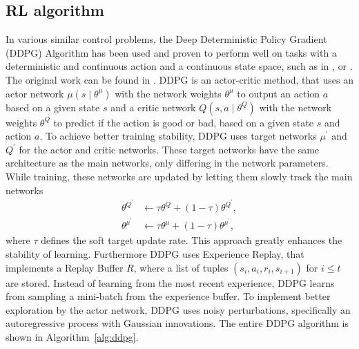 \documentclass[review]{elsarticle}
\providecommand{\3}{{\ss}}
\begin{document}
	\subsection{\label{RL-algorithm}RL algorithm}
	In various similar control problems, the Deep Deterministic Policy
	Gradient (DDPG) Algorithm has been used and proven to perform well on
	tasks with a deterministic and continuous action and a
	continuous state space, such as in
	\cite{SafeEfficientAndComfortable}, \cite{ComparisonRLvsMPC} or
	\cite{HumanLikeAutonomouCF}. The original work can be found in
	\cite{DDPG}. DDPG is an actor-critic method, that uses an actor network
	$\mu\left(s \mid \theta^{\mu}\right)$ with the network weights $\theta^{\mu} $
	to output an action $a$ based on a given state $s$ and a critic network
	$Q\left(s, a \mid \theta^{Q}\right) $ with the network weights  $\theta^{Q}$ to
	predict if the action is good or bad, based on a given state $s$ and
	action $a$. 
	To achieve better training stability, DDPG uses target networks  $\mu^{\prime}$ and $Q^{\prime}$ for the actor and critic networks.
	These target networks have the same architecture as the main networks, only differing in the network parameters. While training, these networks are updated by
	letting them slowly track the main networks
	\begin{align}
		\theta^{Q^{\prime}} & \leftarrow \tau \theta^{Q}+(1-\tau) \theta^{Q^{\prime}}, \\
		\theta^{\mu^{\prime}} & \leftarrow \tau \theta^{\mu}+(1-\tau) \theta^{\mu^{\prime}},
	\end{align}
	where $\tau$ defines the soft target update rate.
	This approach greatly enhances the stability of learning.
	Furthermore DDPG uses Experience Replay, that implements a Replay Buffer $R$, where a list of tuples $\left(s_{i}, a_{i}, r_{i}, s_{i+1}\right)$ for $i \le t$ are stored. Instead of learning from the most recent experience, DDPG learns from sampling a mini-batch from the experience buffer. To implement better exploration by the actor network, DDPG uses noisy perturbations, specifically an autoregressive process with Gaussian innovations. The entire DDPG algorithm is shown in Algorithm~\ref{alg:ddpg}. 
	
\end{document}
